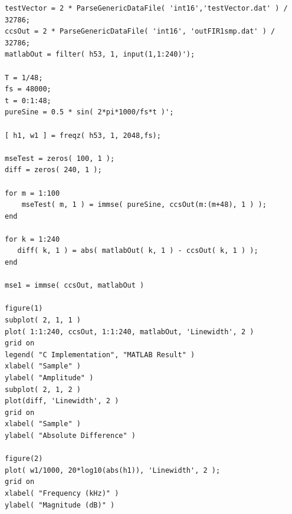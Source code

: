 \documentclass[11pt,pdftex,portrait,letterpaper]{article}
\begin{document}
\pagebreak

\begin{lstlisting}[caption={MATLAB analysis code}, label=l:ml]
testVector = 2 * ParseGenericDataFile( 'int16','testVector.dat' ) / 32786;
ccsOut = 2 * ParseGenericDataFile( 'int16', 'outFIR1smp.dat' ) / 32786;
matlabOut = filter( h53, 1, input(1,1:240)');

T = 1/48;
fs = 48000;
t = 0:1:48;
pureSine = 0.5 * sin( 2*pi*1000/fs*t )';

[ h1, w1 ] = freqz( h53, 1, 2048,fs);

mseTest = zeros( 100, 1 );
diff = zeros( 240, 1 );

for m = 1:100
    mseTest( m, 1 ) = immse( pureSine, ccsOut(m:(m+48), 1 ) );
end

for k = 1:240
   diff( k, 1 ) = abs( matlabOut( k, 1 ) - ccsOut( k, 1 ) );
end

mse1 = immse( ccsOut, matlabOut )

figure(1)
subplot( 2, 1, 1 )
plot( 1:1:240, ccsOut, 1:1:240, matlabOut, 'Linewidth', 2 )
grid on
legend( "C Implementation", "MATLAB Result" )
xlabel( "Sample" )
ylabel( "Amplitude" )
subplot( 2, 1, 2 )
plot(diff, 'Linewidth', 2 )
grid on
xlabel( "Sample" )
ylabel( "Absolute Difference" )

figure(2)
plot( w1/1000, 20*log10(abs(h1)), 'Linewidth', 2 );
grid on
xlabel( "Frequency (kHz)" )
ylabel( "Magnitude (dB)" )
\end{lstlisting}
\end{document}
